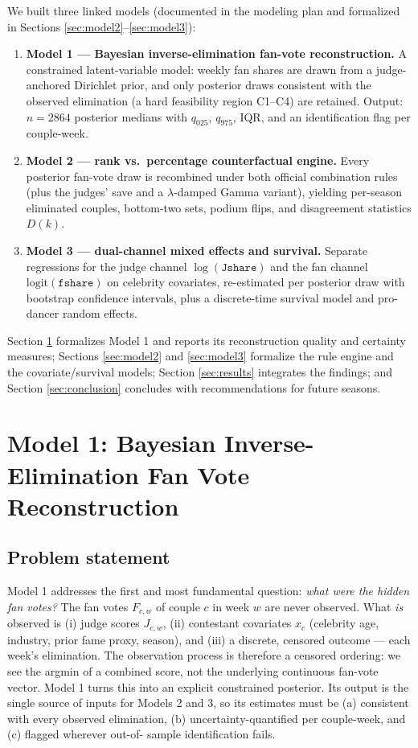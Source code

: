 \documentclass[11pt]{article}
\begin{document}
We built three linked models (documented in the modeling plan and formalized in
Sections \ref{sec:model2}--\ref{sec:model3}):
\begin{enumerate}
\item \textbf{Model 1 --- Bayesian inverse-elimination fan-vote reconstruction.} A
constrained latent-variable model: weekly fan shares are drawn from a judge-anchored
Dirichlet prior, and only posterior draws consistent with the observed elimination (a
hard feasibility region C1--C4) are retained. Output: $n=2864$ posterior medians with
$q_{025}$, $q_{975}$, IQR, and an identification flag per couple-week.
\item \textbf{Model 2 --- rank vs.\ percentage counterfactual engine.} Every posterior
fan-vote draw is recombined under both official combination rules (plus the judges'
save and a $\lambda$-damped Gamma variant), yielding per-season eliminated couples,
bottom-two sets, podium flips, and disagreement statistics $D(k)$.
\item \textbf{Model 3 --- dual-channel mixed effects and survival.} Separate regressions
for the judge channel $\log(\texttt{Jshare})$ and the fan channel
$\mathrm{logit}(\texttt{fshare})$ on celebrity covariates, re-estimated per posterior
draw with bootstrap confidence intervals, plus a discrete-time survival model and
pro-dancer random effects.
\end{enumerate}

Section \ref{sec:model1} formalizes Model 1 and reports its reconstruction quality and
certainty measures; Sections \ref{sec:model2} and \ref{sec:model3} formalize the rule
engine and the covariate/survival models; Section \ref{sec:results} integrates the
findings; and Section \ref{sec:conclusion} concludes with recommendations for future
seasons.

\section{Model 1: Bayesian Inverse-Elimination Fan Vote Reconstruction}
\label{sec:model1}
\subsection{Problem statement}

Model 1 addresses the first and most fundamental question: \emph{what were the hidden fan
votes?} The fan votes $F_{c,w}$ of couple $c$ in week $w$ are never observed. What \emph{is}
observed is (i) judge scores $J_{c,w}$, (ii) contestant covariates $x_c$ (celebrity age,
industry, prior fame proxy, season), and (iii) a discrete, censored outcome --- each
week's elimination. The observation process is therefore a censored ordering: we see the
argmin of a combined score, not the underlying continuous fan-vote vector. Model 1 turns
this into an explicit constrained posterior. Its output is the single source of inputs
for Models 2 and 3, so its estimates must be (a) consistent with every observed
elimination, (b) uncertainty-quantified per couple-week, and (c) flagged wherever out-of-
sample identification fails.
\end{document}
